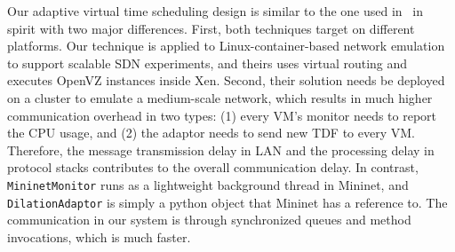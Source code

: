 
Our adaptive virtual time scheduling design is similar to the one used in~\cite{NtwkEmultAdaptVirtTime} in spirit with two major differences. 
First, both techniques target on different platforms. 
Our technique is applied to Linux-container-based network emulation to support scalable SDN experiments,
and theirs uses virtual routing and executes OpenVZ instances inside Xen. 
Second, their solution needs be deployed on a cluster to emulate a medium-scale network, which results in much higher communication overhead in two types:
(1) every VM's monitor needs to report the CPU usage, and
(2) the adaptor needs to send new TDF to every VM. 
Therefore, the message transmission delay in LAN and the processing delay in protocol stacks contributes to the overall communication delay. 
In contrast, \texttt{MininetMonitor} runs as a lightweight background thread in Mininet,
and \texttt{DilationAdaptor} is simply a python object that Mininet has a reference to. 
The communication in our system is through synchronized queues and method invocations, which is much faster. 

